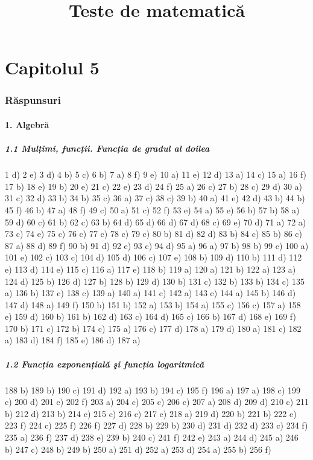 \documentclass[11pt]{article}
\title{Teste de matematică}
\author{}
\date{}
\begin{document}
\maketitle

\part*{Capitolul 5}
\section*{Răspunsuri}
\subsection*{1. Algebră}
\subsubsection*{1.1 Mulțimi, funcții. Funcția de gradul al doilea}
1 d) 2 e) 3 d) 4 b) 5 c) 6 b) 7 a) 8 f) 9 e) 10 a) 11 e) 12 d) 13 a) 14 c) 15 a) 16 f) 17 b) 18 e) 19 b) 20 e) 21 c) 22 e) 23 d) 24 f) 25 a) 26 c) 27 b) 28 c) 29 d) 30 a) 31 c) 32 d) 33 b) 34 b) 35 c) 36 a) 37 c) 38 c) 39 b) 40 a) 41 e) 42 d) 43 b) 44 b) 45 f) 46 b) 47 a) 48 f) 49 c) 50 a) 51 c) 52 f) 53 e) 54 a) 55 e) 56 b) 57 b) 58 a) 59 d) 60 c) 61 b) 62 c) 63 b) 64 d) 65 d) 66 d) 67 d) 68 c) 69 e) 70 d) 71 a) 72 a) 73 c) 74 e) 75 c) 76 c) 77 c) 78 c) 79 c) 80 b) 81 d) 82 d) 83 b) 84 c) 85 b) 86 c) 87 a) 88 d) 89 f) 90 b) 91 d) 92 e) 93 c) 94 d) 95 a) 96 a) 97 b) 98 b) 99 c) 100 a) 101 e) 102 c) 103 c) 104 d) 105 d) 106 c) 107 e) 108 b) 109 d) 110 b) 111 d) 112 e) 113 d) 114 e) 115 c) 116 a) 117 e) 118 b) 119 a) 120 a) 121 b) 122 a) 123 a) 124 d) 125 b) 126 d) 127 b) 128 b) 129 d) 130 b) 131 c) 132 b) 133 b) 134 c) 135 a) 136 b) 137 c) 138 c) 139 a) 140 a) 141 c) 142 a) 143 e) 144 a) 145 b) 146 d) 147 d) 148 a) 149 f) 150 b) 151 b) 152 a) 153 b) 154 a) 155 c) 156 c) 157 a) 158 e) 159 d) 160 b) 161 b) 162 d) 163 c) 164 d) 165 c) 166 b) 167 d) 168 e) 169 f) 170 b) 171 c) 172 b) 174 c) 175 a) 176 c) 177 d) 178 a) 179 d) 180 a) 181 c) 182 a) 183 d) 184 f) 185 e) 186 d) 187 a)

\subsubsection*{1.2 Funcția exponențială şi funcția logaritmică}
188 b) 189 b) 190 c) 191 d) 192 a) 193 b) 194 c) 195 f) 196 a) 197 a) 198 c) 199 c) 200 d) 201 e) 202 f) 203 a) 204 c) 205 c) 206 c) 207 a) 208 d) 209 d) 210 c) 211 b) 212 d) 213 b) 214 c) 215 c) 216 c) 217 c) 218 a) 219 d) 220 b) 221 b) 222 e) 223 f) 224 c) 225 f) 226 f) 227 d) 228 b) 229 b) 230 d) 231 d) 232 d) 233 c) 234 f) 235 a) 236 f) 237 d) 238 e) 239 b) 240 c) 241 f) 242 e) 243 a) 244 d) 245 a) 246 b) 247 c) 248 b) 249 b) 250 a) 251 d) 252 a) 253 d) 254 a) 255 b) 256 f)
\end{document}
